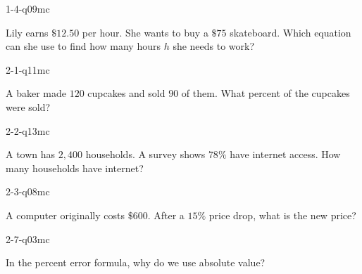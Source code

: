 
\begin{practiceQuestion}{1-4-q09}{mc}
\begin{questionText}
Lily earns $\$12.50$ per hour. She wants to buy a $\$75$ skateboard. Which equation can she use to find how many hours $h$ she needs to work?
\end{questionText}
\end{practiceQuestion}

\begin{practiceQuestion}{2-1-q11}{mc}
\begin{questionText}
A baker made $120$ cupcakes and sold $90$ of them. What percent of the cupcakes were sold?
\end{questionText}
\end{practiceQuestion}

\begin{practiceQuestion}{2-2-q13}{mc}
\begin{questionText}
A town has $2{,}400$ households. A survey shows $78\%$ have internet access. How many households have internet?
\end{questionText}
\end{practiceQuestion}

\begin{practiceQuestion}{2-3-q08}{mc}
\begin{questionText}
A computer originally costs $\$600$. After a $15\%$ price drop, what is the new price?
\end{questionText}
\end{practiceQuestion}

\begin{practiceQuestion}{2-7-q03}{mc}
\begin{questionText}
In the percent error formula, why do we use absolute value?
\end{questionText}
\end{practiceQuestion}

